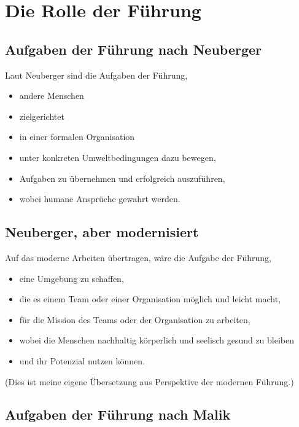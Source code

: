 \section{Die Rolle der Führung}
\label{fuehrung-rolle}


\subsection{Aufgaben der Führung nach Neuberger}

Laut Neuberger\cite{neuberger-fuehren} sind die Aufgaben der Führung,

\begin{itemize}
  \item andere Menschen
  \item zielgerichtet
  \item in einer formalen Organisation
  \item unter konkreten Umweltbedingungen dazu bewegen,
  \item Aufgaben zu übernehmen und erfolgreich auszuführen,
  \item wobei humane Ansprüche gewahrt werden.
\end{itemize}


\subsection{Neuberger, aber modernisiert}

Auf das moderne Arbeiten übertragen, wäre die Aufgabe der Führung,

\begin{itemize}
  \item eine Umgebung zu schaffen,
  \item die es einem Team oder einer Organisation möglich und leicht macht,
  \item für die Mission des Teams oder der Organisation zu arbeiten,
  \item wobei die Menschen nachhaltig körperlich und seelisch gesund zu bleiben
  \item und ihr Potenzial nutzen können.
\end{itemize}

(Dies ist meine eigene \glqq Übersetzung\grqq{} aus Perspektive der modernen Führung.)


\subsection{Aufgaben der Führung nach Malik}

